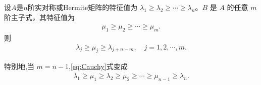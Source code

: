 \documentclass[../../main.tex]{subfiles}%
\begin{document}
\begin{theorem}[Cauchy交错定理]\label{theorem:Cauchy交错定理}
设$A$是$n$阶实对称或Hermite矩阵的特征值为 $\lambda_1\geqslant \lambda_2\geqslant \cdots \geqslant \lambda_n$。$B$ 是 $A$ 的任意 $m$ 阶主子式，其特征值为
\begin{align*}
\mu_1\geqslant \mu_2\geqslant \cdots \geqslant \mu_m.
\end{align*}
则
\begin{align}
\lambda_j \geqslant \mu_j \geqslant \lambda_{j+n-m}, \quad j=1,2,\cdots,m.
\label{eq:Cauchy}
\end{align}
\end{theorem}
\begin{remark}
特别地,当 $m=n-1$,\eqref{eq:Cauchy}式变成
\begin{align*}
\lambda_1\geqslant \mu_1\geqslant \lambda_2\geqslant \mu_2\geqslant \cdots \geqslant \mu_{n-1}\geqslant \lambda_n.
\end{align*}
\end{remark}
\end{document}
